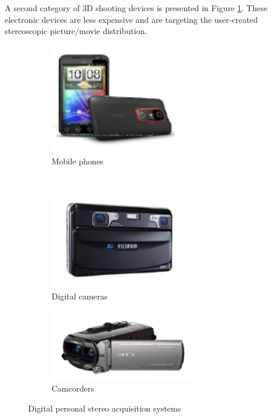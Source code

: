 A second category of 3D shooting devices is presented in Figure \ref{fig:mobile}. These electronic devices are less expensive and are targeting the user-created stereoscopic picture/movie distribution.\\
\begin{figure}[h!]
\centering
\begin{subfigure}[]{0.4\textwidth}
\centering
\includegraphics[width=0.7\textwidth]{./img/devices1.png}
\caption{\scriptsize{Mobile phones}}
\end{subfigure}%
~ %
\begin{subfigure}[]{0.25\textwidth}
\centering
\includegraphics[width=0.7\textwidth]{./img/devices2.png}
\caption{\scriptsize{Digital cameras}}
\end{subfigure} 
\begin{subfigure}[]{0.4\textwidth}
\centering
\includegraphics[width=0.7\textwidth]{./img/devices3.png}
\caption{\scriptsize{Camcorders}}
\end{subfigure}%
\caption{\small{Digital personal stereo acquisition systems}}\label{fig:mobile}
\end{figure}

